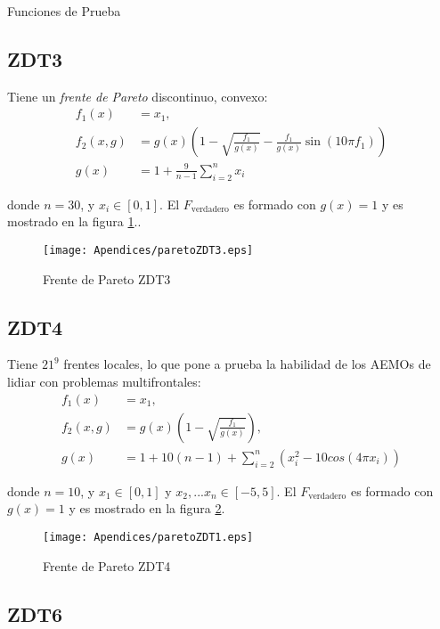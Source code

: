 \begin{chapter}{Funciones de Prueba}
\subsection*{ZDT3}

Tiene un {\it frente de Pareto}  discontinuo, convexo:\\

\begin{align*}
f_1(x)&=x_1,\\
f_2(x,g)&=g(x)(1-\sqrt{\frac{f_1}{g(x)}}-\frac{f_1}{g(x)}\sin(10\pi f_1))\\
g(x)&=1+\frac{9}{n-1}\sum_{i=2}^nx_i
\end{align*}

donde $n=30$, y $x_i\in[0,1]$. El $F_\text{verdadero}$ es formado con $g(x)=1$ y es mostrado en la figura \ref{fig:ZDT3}..




\begin{figure}[h!]
 \centering
\texttt{[image: Apendices/paretoZDT3.eps]}
\caption{Frente de Pareto ZDT3}
\label{fig:ZDT3}
\end{figure} 






\subsection*{ZDT4}

Tiene  $21^9$ frentes locales, lo que pone a prueba la habilidad de los AEMOs de lidiar con problemas multifrontales:\\

\begin{align*}
f_1(x)&=x_1,\\
f_2(x,g)&=g(x)(1-\sqrt{ \frac{f_1}{g(x)}}),\\
g(x)&=1+10 (n-1)+ \sum_{i=2}^n(x_i^2-10cos(4\pi x_i))
\end{align*}

donde $n=10$, y $x_1\in[0,1]$ y $x_2,...x_n\in[-5,5]$. El $F_\text{verdadero}$ es formado con $g(x)=1$ y es mostrado en la figura \ref{fig:ZDT4}.

\begin{figure}[h!]
 \centering
\texttt{[image: Apendices/paretoZDT1.eps]}
\caption{Frente de Pareto ZDT4}
\label{fig:ZDT4}
\end{figure} 


\subsection*{ZDT6}




\end{chapter}
